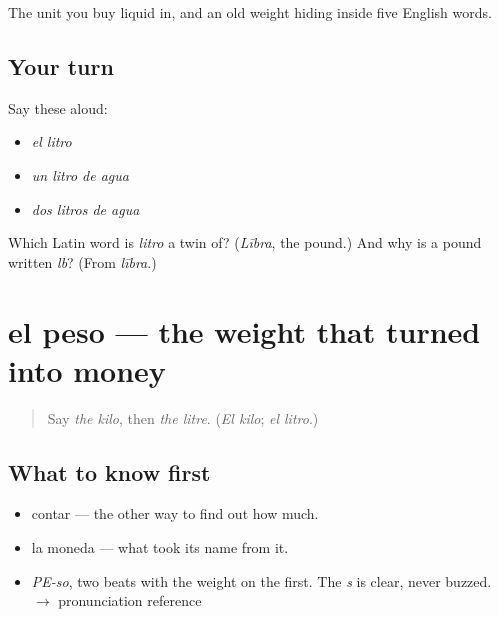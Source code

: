 \begin{grammarlens}[title={What you've built}]
The unit you buy liquid in, and an old weight hiding inside five English words.
\end{grammarlens}

\subsection*{Your turn}
Say these aloud:

\begin{itemize}
\raggedright
  \item \emph{el litro}
  \item \emph{un litro de agua}
  \item \emph{dos litros de agua}
\end{itemize}

\begin{tcolorbox}[breakable,colback=teal!4,colframe=teal!35!black,title={Before you move on}]
Which Latin word is \emph{litro} a twin of? (\emph{Lībra}, the pound.) And why is a pound written \emph{lb}? (From \emph{lībra}.)
\end{tcolorbox}
\section[el peso]{el peso — the weight that turned into money}

\label{lesson:ES-C359-peso}



\begin{quote}
Say \emph{the kilo}, then \emph{the litre}. (\emph{El kilo}; \emph{el litro}.)
\end{quote}

\subsection*{What to know first}
\begin{itemize}
\raggedright
  \item contar — the other way to find out how much.
  \item la moneda — what took its name from it.
\end{itemize}

\begin{sounds}
\begin{itemize}
\raggedright
  \item \emph{PE-so}, two beats with the weight on the first. The \emph{s} is clear, never buzzed. $\to$ pronunciation reference
\end{itemize}
\end{sounds}

